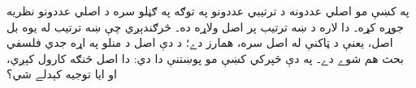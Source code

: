 \documentclass[../../../include/open-logic-section]{subfiles}
\begin{document}


په  کښې مو
اصلي عددونه د ترتيبي عددونو په توګه په ګڼلو سره د اصلي عددونو
نظريه جوړه کړه۔ دا لاره د ښه ترتيب پر اصل ولاړه ده۔ څرګندېږي
چې ښه ترتيب له يوه بل اصل، يعنې د ټاکنې له اصل سره، همارز
دے؛ د دې اصل د منلو په اړه جدي فلسفي بحث هم شوے دے۔
په دې څپرکي کښې مو پوښتنې دا دي: دا اصل څنګه کارول کېږي،
او ايا توجيه کېدلے شي؟
\end{document}
